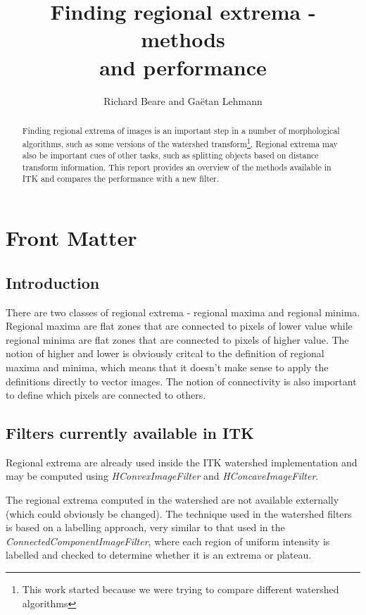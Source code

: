 \documentclass{InsightArticle}
\title{Finding regional extrema - methods\\ and performance}
\author{Richard Beare and Ga\"etan Lehmann}
\begin{document}
\maketitle

\ifhtml
\chapter*{Front Matter\label{front}}
\fi

\begin{abstract}
\noindent
Finding regional extrema of images is an important step in a number of
morphological algorithms, such as some versions of the watershed
transform\footnote{This work started because we were trying to compare
different watershed algorithms}. Regional extrema may also be
important cues of other tasks, such as splitting objects based on
distance transform information. This report provides an overview of
the methods available in ITK and compares the performance with a new
filter.
\end{abstract}


\section{Introduction}
There are two classes of regional extrema - regional maxima and
regional minima. Regional maxima are flat zones that are connected to
pixels of lower value while regional minima are flat zones that are
connected to pixels of higher value. The notion of higher and lower is
obviously critcal to the definition of regional maxima and minima,
which means that it doesn't make sense to apply the definitions
directly to vector images. The notion of connectivity is also important
to define which pixels are connected to others.

\section{Filters currently available in ITK}
Regional extrema are already used inside the ITK watershed
implementation and may be computed using {\em HConvexImageFilter}
and {\em HConcaveImageFilter}. 

The regional extrema computed in the watershed are not available
externally (which could obviously be changed). The technique used in
the watershed filters is based on a labelling approach, very similar
to that used in the {\em ConnectedComponentImageFilter}, where each
region of uniform intensity is labelled and checked to determine
whether it is an extrema or plateau.
\end{document}
